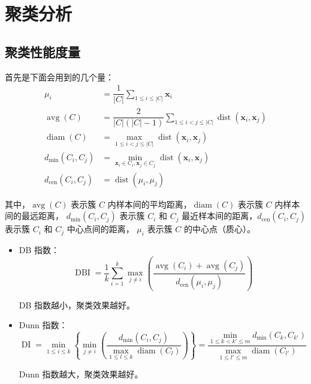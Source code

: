 \section{聚类分析}

\subsection{聚类性能度量}
首先是下面会用到的几个量：
\begin{equation}
    \begin{aligned}
        \mu_i &= \dfrac 1{|C|}\sum\limits_{1 \leq i \leq |C|} \boldsymbol{x}_i \\
        \operatorname{avg}(C) &= \dfrac{2}{|C|(|C|-1)} \sum\limits_{1 \leq i < j \leq |C|} \operatorname{dist}(\boldsymbol{x}_i, \boldsymbol{x}_j) \\
        \operatorname{diam}(C) &= \max_{1 \leq i < j \leq |C|} \operatorname{dist}(\boldsymbol{x}_i, \boldsymbol{x}_j) \\
        d_{\min}(C_i, C_j) &= \min_{\boldsymbol{x}_i \in C_i, \boldsymbol{x}_j \in C_j} \operatorname{dist}(\boldsymbol{x}_i, \boldsymbol{x}_j) \\
        d_{\text{cen}}(C_i, C_j) &= \operatorname{dist}(\mu_i, \mu_j)
        \end{aligned}
\end{equation}

其中，$\operatorname{avg}(C)$ 表示簇 $C$ 内样本间的平均距离，$\operatorname{diam}(C)$ 表示簇 $C$ 内样本间的最远距离，
$d_{\min}(C_i, C_j)$ 表示簇 $C_i$ 和 $C_j$ 最近样本间的距离，$d_{\text{cen}}(C_i, C_j)$ 表示簇 $C_i$ 和 $C_j$ 中心点间的距离，
$\mu_i$ 表示簇 $C$ 的中心点（质心）。

\begin{itemize}
    \item DB 指数：
    \begin{equation}
        \operatorname{DBI} = \dfrac 1k \sum\limits_{i=1}^k{\max_{j \neq i}\left(\dfrac{\operatorname{avg}(C_i)
         + \operatorname{avg}(C_j)}{d_{\text{cen}}(\mu_i, \mu_j)}\right)}
    \end{equation}\par
    DB 指数越小，聚类效果越好。
    \item Dunn 指数：
    \begin{equation}
        \operatorname{DI} = \min_{1 \leq i \leq k}\left\{\min_{j \neq i}\left(\dfrac{d_{\min}(C_i, C_j)}
        {\max\limits_{1 \leq l \leq k}\operatorname{diam}(C_l)}\right)\right\} 
        = \dfrac{\min_{1 \leq k < k' \leq m}d_{\min}(C_k, C_{k'})}{\max_{1 \leq l' \leq m}\operatorname{diam}(C_{l'})}
    \end{equation}\par
    Dunn 指数越大，聚类效果越好。
\end{itemize}


